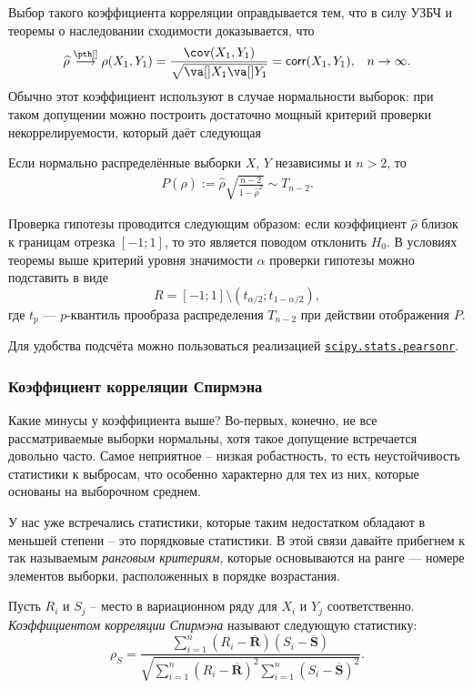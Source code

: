 Выбор такого коэффициента корреляции оправдывается тем, что в силу УЗБЧ и теоремы о наследовании сходимости доказывается, что
\[
    \widehat{\rho} \stackrel{\pth[]}{\longrightarrow} \rho(X_1, Y_1) = \frac{\cov(X_1, Y_1)}{\sqrt{\va[]X_1 \va[]Y_1}} = \mathsf{corr}(X_1, Y_1), \;\;\;n\to \infty.
\]
Обычно этот коэффициент используют в случае нормальности выборок: при таком допущении можно построить достаточно мощный критерий проверки некоррелируемости, который даёт следующая
\begin{theorem}[label=rho_disrt_under_norm]{}{}
Если нормально распределённые выборки $X$, $Y$ независимы и $n > 2$, то
    \begin{gather*}
        P(\widehat \rho) := \widehat{\rho}\sqrt{\frac{n-2}{1-\widehat{\rho}^2}} \sim T_{n-2}.
    \end{gather*}
\end{theorem}

Проверка гипотезы проводится следующим образом: если коэффициент $\widehat{\rho}$ близок к границам отрезка $[-1; 1]$, то это является поводом отклонить $H_0$. В условиях теоремы выше критерий уровня значимости $\alpha$ проверки гипотезы можно подставить в виде
\[
R = [-1; 1] \setminus (t_{\alpha/2}; t_{1-\alpha/2}),
\]
где $t_{p}$ --- $p$-квантиль прообраза распределения $T_{n-2}$ при действии отображения $P$.

Для удобства подсчёта можно пользоваться реализацией \href{https://docs.scipy.org/doc/scipy/reference/generated/scipy.stats.pearsonr.html}{\texttt{scipy.stats.pearsonr}}.

\subsubsection{Коэффициент корреляции Спирмэна}

Какие минусы у коэффициента выше? Во-первых, конечно, не все рассматриваемые выборки нормальны, хотя такое допущение встречается довольно часто. Самое неприятное -- низкая робастность, то есть неустойчивость статистики к выбросам, что особенно характерно для тех из них, которые основаны на выборочном среднем.

У нас уже встречались статистики, которые таким недостатком обладают в меньшей степени -- это порядковые статистики. В этой связи давайте прибегнем к так называемым \textit{ранговым критериям}, которые основываются на ранге --- номере элементов выборки, расположенных в порядке возрастания.

\begin{definition}
    Пусть $R_i$ и $S_j$ -- место в вариационном ряду для $X_i$ и $Y_j$ соответственно. \textit{Коэффициентом корреляции Спирмэна} называют следующую статистику:
    \[
    \rho_S = \frac{\sum_{i=1}^n (R_i - \overline{\mathbf R})(S_i - \overline{\mathbf S})}{\sqrt{\sum_{i=1}^n (R_i - \overline{\mathbf R})^2 \sum_{i=1}^n (S_i - \overline{\mathbf S})^2}}.
    \]
\end{definition}

